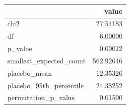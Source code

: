 \begin{tabular}{lr}
\toprule
 & value \\
\midrule
chi2 & 27.54183 \\
df & 6.00000 \\
p\_value & 0.00012 \\
smallest\_expected\_count & 562.92646 \\
placebo\_mean & 12.35326 \\
placebo\_95th\_percentile & 24.38252 \\
permutation\_p\_value & 0.01500 \\
\bottomrule
\end{tabular}
